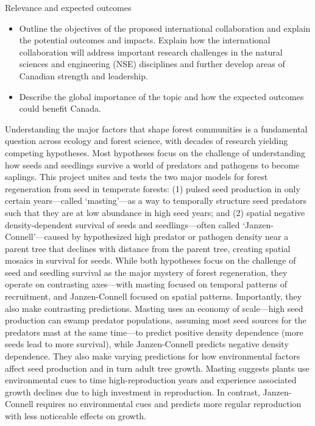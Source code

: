 \documentclass[12pt,oneside]{article}
\newenvironment{smitemize}{
\begin{itemize}
  \setlength{\itemsep}{1pt}
  \setlength{\parskip}{0pt}
  \setlength{\parsep}{0pt}}
{\end{itemize}
}
\begin{document}
{\sc Relevance and expected outcomes} 
\vspace{-1ex}
\begin{smitemize}
\item Outline the objectives of the proposed international collaboration and explain the potential outcomes and impacts. Explain how the international collaboration will address important research challenges in the natural sciences and engineering (NSE) disciplines and further develop areas of Canadian strength and leadership. 
\item Describe the global importance of the topic and how the expected outcomes could benefit Canada.
\end{smitemize}
Understanding the major factors that shape forest communities is a fundamental question across ecology and forest science, with decades of research yielding competing hypotheses. Most hypotheses focus on the challenge of understanding how seeds and seedlings survive a world of predators and pathogens to become saplings.\cite{janzen1971seed,connell1983prevalence,comita2014testing,davies2024seed} This project unites and tests the two major models for forest regeneration from seed in temperate forests: (1) pulsed seed production in only certain years---called `masting'---as a way to temporally structure seed predators such that they are at low abundance in high seed years;\cite{koenig2021brief,pearse2016mechanisms} and (2) spatial negative density-dependent survival of seeds and seedlings\cite{connell1983prevalence,comita2014testing}---often called `Janzen-Connell'---caused by hypothesized high predator or pathogen density near a parent tree that declines with distance from the parent tree, creating spatial mosaics in survival for seeds.\cite{janzen1970herbivores,connell1983prevalence} While both hypotheses focus on the challenge of seed and seedling survival as the major mystery of forest regeneration, they operate on contrasting axes---with masting focused on temporal patterns of recruitment,\cite{pearse2017inter} and Janzen-Connell focused on spatial patterns. Importantly, they also make contrasting predictions. Masting uses an economy of scale---high seed production can swamp predator populations, assuming most seed sources for the predators mast at the same time---to predict positive density dependence (more seeds lead to more survival), while Janzen-Connell predicts negative density dependence. They also make varying predictions for how environmental factors affect seed production and in turn adult tree growth. Masting suggests plants use environmental cues to time high-reproduction years and experience associated growth declines due to high investment in reproduction.\cite{koenig1998scale,hacket2016tree,pearse2016mechanisms,bogdziewicz2021climate} In contrast, Janzen-Connell requires no environmental cues and predicts more regular reproduction with less noticeable effects on growth. 
\end{document}
